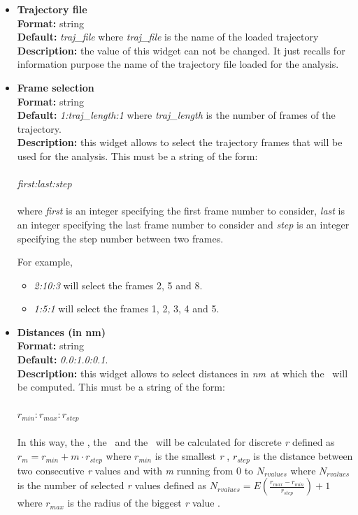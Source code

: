 \documentclass[a4paper,11pt]{report}
\newcommand{\nm}{\textit{nm}}
\begin{document}
\hypertarget{pdf_trajectory_file}{}
\begin{itemize}
\item \textbf{Trajectory file}\\
\textbf{Format:} string\\
\textbf{Default:} \textit{traj\_file} where \textit{traj\_file} is the name of the loaded trajectory\\
\textbf{Description:} the value of this widget can not be changed. It just recalls for information purpose the name
of the trajectory file loaded for the analysis.

\hypertarget{pdf_frame_selection}{}
\item \textbf{Frame selection}\\
\textbf{Format:} string\\
\textbf{Default:} \textit{1:traj\_length:1} where \textit{traj\_length} is the number of frames of the trajectory.\\
\textbf{Description:} this widget allows to select the trajectory frames that will be used for the analysis. This must
be a string of the form:
\\\\
\textit{first:last:step}
\\\\
where \textit{first} is an integer specifying the first frame number to consider, \textit{last} is an integer specifying the last 
frame number to consider and \textit{step} is an integer specifying the step number between two frames.

For example,
\begin{itemize}
\item \textit{2:10:3} will select the frames 2, 5 and 8.
\item \textit{1:5:1} will select the frames 1, 2, 3, 4 and 5.
\end{itemize}

\hypertarget{pdf_distances_values}{}
\item \textbf{Distances (in nm)}\\
\textbf{Format:} string\\
\textbf{Default:} \textit{0.0:1.0:0.1}.\\
\textbf{Description:} this widget allows to select distances in \nm\ at which the \PDF\ will be computed. This must
be a string of the form:
\\\\
$r_{min}:r_{max}:r_{step}$
\\\\
In this way, the \PDF , the \RDF\ and the \TCF\ will be calculated for discrete \textit{r} defined as 
$r_m = r_{min} + m \cdot r_{step}$ where $r_{min}$ is the smallest \textit{r} , $r_{step}$ is the 
distance between two consecutive \textit{r} values and with \textit{m} running from 0 to $N_{rvalues}$ 
where $N_{rvalues}$ is the number of selected \textit{r} values defined as 
$N_{rvalues}= E(\frac{r_{max} - r_{min}}{r_{step}}) + 1$ where $r_{max}$ is the 
radius of the biggest \textit{r} value .


\end{itemize}
\end{document}
